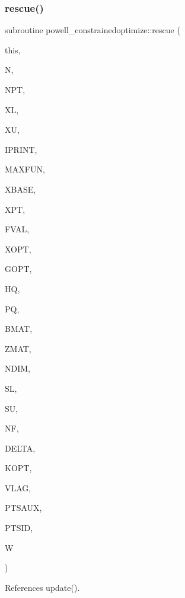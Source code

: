 \subsubsection{\texorpdfstring{rescue()}{rescue()}}
{\footnotesize\ttfamily subroutine powell\+\_\+constrainedoptimize\+::rescue (\begin{DoxyParamCaption}\item[{class(\mbox{\hyperlink{structpowell__constrainedoptimize_1_1tbobyqa}{tbobyqa}})}]{this,  }\item[{}]{N,  }\item[{}]{N\+PT,  }\item[{dimension($\ast$)}]{XL,  }\item[{dimension($\ast$)}]{XU,  }\item[{}]{I\+P\+R\+I\+NT,  }\item[{}]{M\+A\+X\+F\+UN,  }\item[{dimension($\ast$)}]{X\+B\+A\+SE,  }\item[{dimension(npt,$\ast$)}]{X\+PT,  }\item[{dimension($\ast$)}]{F\+V\+AL,  }\item[{dimension($\ast$)}]{X\+O\+PT,  }\item[{dimension($\ast$)}]{G\+O\+PT,  }\item[{dimension($\ast$)}]{HQ,  }\item[{dimension($\ast$)}]{PQ,  }\item[{dimension(ndim,$\ast$)}]{B\+M\+AT,  }\item[{dimension(npt,$\ast$)}]{Z\+M\+AT,  }\item[{}]{N\+D\+IM,  }\item[{dimension($\ast$)}]{SL,  }\item[{dimension($\ast$)}]{SU,  }\item[{}]{NF,  }\item[{}]{D\+E\+L\+TA,  }\item[{}]{K\+O\+PT,  }\item[{dimension($\ast$)}]{V\+L\+AG,  }\item[{dimension(2,$\ast$)}]{P\+T\+S\+A\+UX,  }\item[{dimension($\ast$)}]{P\+T\+S\+ID,  }\item[{dimension($\ast$)}]{W }\end{DoxyParamCaption})\hspace{0.3cm}{\ttfamily [private]}}



References update().



